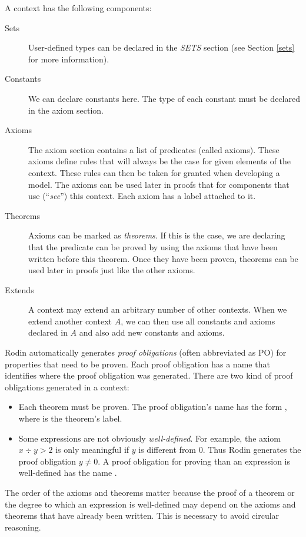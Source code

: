 A context has the following components:
\begin{description}
\item[Sets]
  User-defined types can be declared in the \textsl{SETS} section
  (see Section \ref{sets} for more information).
\item[Constants]
  We can declare constants here. The type of each constant must be declared in the axiom section.
\item[Axioms] The axiom section contains a list of predicates (called axioms).
  These axioms define rules that will always be the case for given elements of the context. These rules can then be taken for granted when developing a model.
  The axioms can be used later in proofs that for components that
  use (``\emph{see}'') this context.
  Each axiom has a label attached to it.
\item[Theorems]
  Axioms can be marked as \emph{theorems}. If this is the case, we are declaring that
  the predicate can be proved by using the axioms that have been written 
  before this theorem.
  Once they have been proven, theorems can be used later in proofs just like the other axioms.
\item[Extends]
  A context may extend an arbitrary number of other contexts.
  When we extend another context $A$, we can then use all constants and axioms declared in $A$ and also add new constants
  and axioms.
\end{description}
Rodin automatically generates \emph{proof obligations} (often abbreviated as PO) for properties that need to be proven. Each proof obligation has a name that identifies where the proof obligation was generated.
There are two kind of proof obligations generated in a context:
\begin{itemize}
  \item Each theorem must be proven. The proof obligation's name has the form 
    , where  is the theorem's label.
  \item Some expressions are not obviously \emph{well-defined}. For example, the axiom $x \div y > 2$ is only meaningful if $y$ is different from 0.
    Thus Rodin generates the proof obligation $y\neq 0$.
    A proof obligation for proving than an expression is well-defined has the name .
\end{itemize}
The order of the axioms and theorems matter because the proof of a theorem or the degree to which an expression is well-defined may depend on the axioms and theorems that have already been written. This is necessary to avoid circular reasoning.


